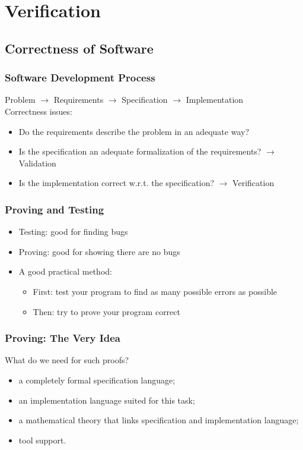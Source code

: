 \section{Verification}
\begin{multicols}{2}
\subsection{Correctness of Software}
\subsubsection{Software Development Process}
Problem $\rightarrow$ Requirements $\rightarrow$ Specification $\rightarrow$ Implementation\\

Correctness issues:
\begin{itemize}
  \item Do the requirements describe the problem in an adequate way?
  \item Is the specification an adequate formalization of the requirements? $\rightarrow$ Validation
  \item Is the implementation correct w.r.t. the specification? $\rightarrow$ Verification
\end{itemize}

\subsubsection{Proving and Testing}
\begin{itemize}
  \item Testing: good for finding bugs
  \item Proving: good for showing there are no bugs
  \item A good practical method:
  \begin{itemize}
    \item First: test your program to find as many possible errors as possible
    \item Then: try to prove your program correct
  \end{itemize}
\end{itemize}

\subsubsection{Proving: The Very Idea}
What do we need for such proofs?
\begin{itemize}
  \item a completely formal specification language;
  \item an implementation language suited for this task;
  \item a mathematical theory that links specification and implementation language;
  \item tool support.
\end{itemize}


\end{multicols}
